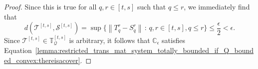 \documentclass[10pt,a4paper]{paper}
\theoremstyle{definition}
\newtheorem{claim}{Claim}[theorem]
\newcommand{\rateset}{\mathcal{Q}}
\newcommand{\norm}[1]{\left\lVert #1 \right\rVert}
\newcommand{\coloneqq}{:\!=}
\begin{document}
\begin{proof}
Since this is true for all $q,r\in[t,s]$ such that $q\leq r$, we immediately find that
\begin{equation*}
d(\mathcal{T}^{[t,s]},\mathcal{S}^{[t,s]}) = \sup\{\norm{T_q^r - S_q^r}\,:\,q,r\in[t,s], q\leq r\} \leq \frac{\epsilon}{2}<\epsilon.
\end{equation*}
Since $\mathcal{T}^{[t,s]}\in\mathbb{T}_\rateset^{[t,s]}$ is arbitrary, it follows that $\mathbb{C}_\epsilon$ satisfies Equation~\eqref{lemma:restricted_trans_mat_system_totally_bounded_if_Q_bounded_convex:thereisacover}.
\end{proof}

\end{document}
